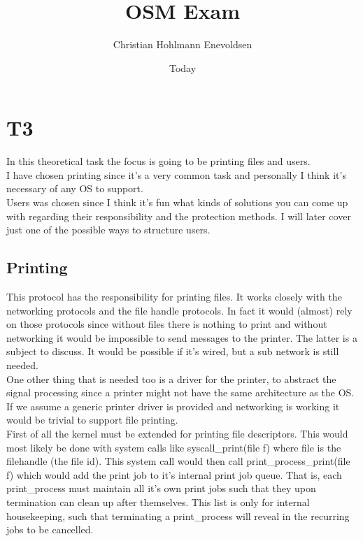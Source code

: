 \documentclass[]{article}
\begin{document}
\title{OSM Exam}
\author{Christian Hohlmann Enevoldsen}
\date{Today}
\maketitle


\section*{T3}

In this theoretical task the focus is going to be printing files and users. \\

I have chosen printing since it's a very common task and personally I think it's necessary of any OS to support.\\

Users was chosen since I think it's fun what kinds of solutions you can come up with regarding their responsibility and the protection methods. I will later cover just one of the possible ways to structure users.  

\subsection*{Printing}

This protocol has the responsibility for printing files. It works closely with the networking protocols and the file handle protocols. In fact it would (almost) rely on those protocols since without files there is nothing to print and without networking it would be impossible to send messages to the printer. The latter is a subject to discuss. It would be possible if it's wired, but a sub network is still needed.\\

One other thing that is needed too is a driver for the printer, to abstract the signal processing since a printer might not have the same architecture as the OS. If we assume a generic printer driver is provided and networking is working it would be trivial to support file printing.\\

First of all the kernel must be extended for printing file descriptors. This would most likely be done with system calls like syscall\_print(file f) where file is the filehandle (the file id). This system call would then call print\_process\_print(file f) which would add the print job to it's internal print job queue. That is, each print\_process must maintain all it's own print jobs such that they upon termination can clean up after themselves. This list is only for internal housekeeping, such that terminating a print\_process will reveal in the recurring jobs to be cancelled.\\
\end{document}
